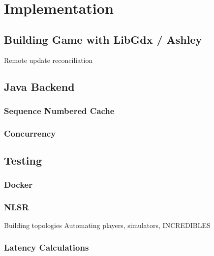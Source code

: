 \chapter{Implementation}
\section{Building Game with LibGdx / Ashley}
Remote update reconciliation

\section{Java Backend}
\subsection{Sequence Numbered Cache}
\subsection{Concurrency}


\section{Testing}
\subsection{Docker}
\subsection{NLSR}
Building topologies
Automating players, simulators, INCREDIBLES
\subsection{Latency Calculations}